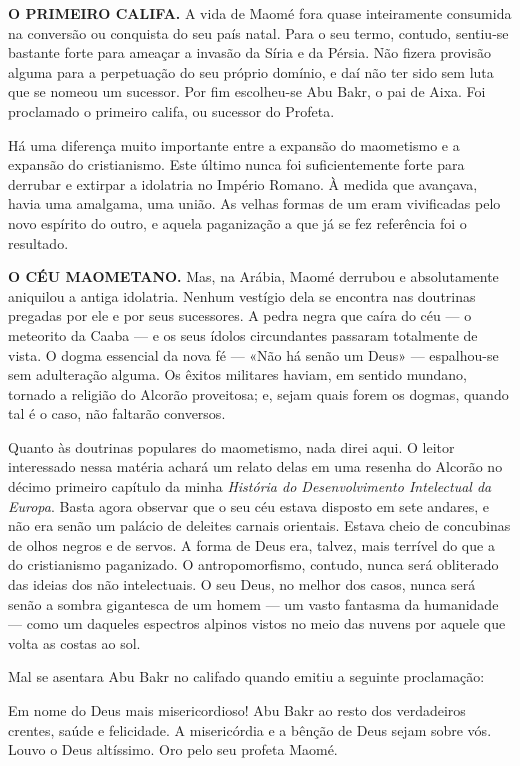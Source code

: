 \documentclass[11pt,a5paper,twoside,openany]{book}
\begin{document}
\textbf{O PRIMEIRO CALIFA.} A vida de Maomé fora quase inteiramente consumida na conversão ou conquista do seu país natal. Para o seu termo, contudo, sentiu-se bastante forte para ameaçar a invasão da Síria e da Pérsia. Não fizera provisão alguma para a perpetuação do seu próprio domínio, e daí não ter sido sem luta que se nomeou um sucessor. Por fim escolheu-se Abu Bakr, o pai de Aixa. Foi proclamado o primeiro califa, ou sucessor do Profeta.

Há uma diferença muito importante entre a expansão do maometismo e a expansão do cristianismo. Este último nunca foi suficientemente forte para derrubar e extirpar a idolatria no Império Romano. À medida que avançava, havia uma amalgama, uma união. As velhas formas de um eram vivificadas pelo novo espírito do outro, e aquela paganização a que já se fez referência foi o resultado.

\textbf{O CÉU MAOMETANO.} Mas, na Arábia, Maomé derrubou e absolutamente aniquilou a antiga idolatria. Nenhum vestígio dela se encontra nas doutrinas pregadas por ele e por seus sucessores. A pedra negra que caíra do céu — o meteorito da Caaba — e os seus ídolos circundantes passaram totalmente de vista. O dogma essencial da nova fé — «Não há senão um Deus» — espalhou-se sem adulteração alguma. Os êxitos militares haviam, em sentido mundano, tornado a religião do Alcorão proveitosa; e, sejam quais forem os dogmas, quando tal é o caso, não faltarão conversos.

Quanto às doutrinas populares do maometismo, nada direi aqui. O leitor interessado nessa matéria achará um relato delas em uma resenha do Alcorão no décimo primeiro capítulo da minha \textit{História do Desenvolvimento Intelectual da Europa}. Basta agora observar que o seu céu estava disposto em sete andares, e não era senão um palácio de deleites carnais orientais. Estava cheio de concubinas de olhos negros e de servos. A forma de Deus era, talvez, mais terrível do que a do cristianismo paganizado. O antropomorfismo, contudo, nunca será obliterado das ideias dos não intelectuais. O seu Deus, no melhor dos casos, nunca será senão a sombra gigantesca de um homem — um vasto fantasma da humanidade — como um daqueles espectros alpinos vistos no meio das nuvens por aquele que volta as costas ao sol.

Mal se asentara Abu Bakr no califado quando emitiu a seguinte proclamação:

Em nome do Deus mais misericordioso! Abu Bakr ao resto dos verdadeiros crentes, saúde e felicidade. A misericórdia e a bênção de Deus sejam sobre vós. Louvo o Deus altíssimo. Oro pelo seu profeta Maomé.
\end{document}
